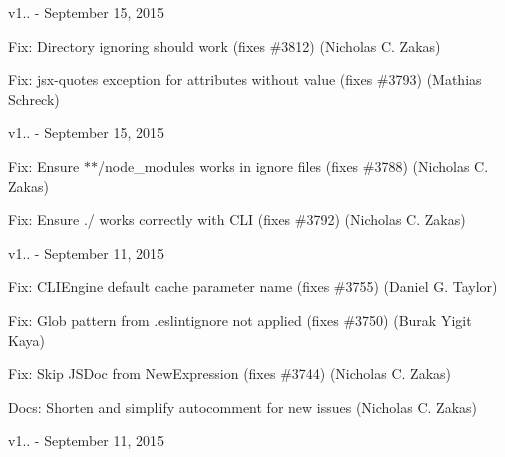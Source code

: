 v1.. -\/ September 15, 2015


\begin{DoxyItemize}
\item Fix\+: Directory ignoring should work (fixes \#3812) (Nicholas C. Zakas)
\item Fix\+: jsx-\/quotes exception for attributes without value (fixes \#3793) (Mathias Schreck)
\end{DoxyItemize}

v1.. -\/ September 15, 2015


\begin{DoxyItemize}
\item Fix\+: Ensure $\ast$$\ast$/node\+\_\+modules works in ignore files (fixes \#3788) (Nicholas C. Zakas)
\item Fix\+: Ensure ./ works correctly with C\+LI (fixes \#3792) (Nicholas C. Zakas)
\end{DoxyItemize}

v1.. -\/ September 11, 2015


\begin{DoxyItemize}
\item Fix\+: C\+L\+I\+Engine default cache parameter name (fixes \#3755) (Daniel G. Taylor)
\item Fix\+: Glob pattern from .eslintignore not applied (fixes \#3750) (Burak Yigit Kaya)
\item Fix\+: Skip J\+S\+Doc from New\+Expression (fixes \#3744) (Nicholas C. Zakas)
\item Docs\+: Shorten and simplify autocomment for new issues (Nicholas C. Zakas)
\end{DoxyItemize}

v1.. -\/ September 11, 2015


